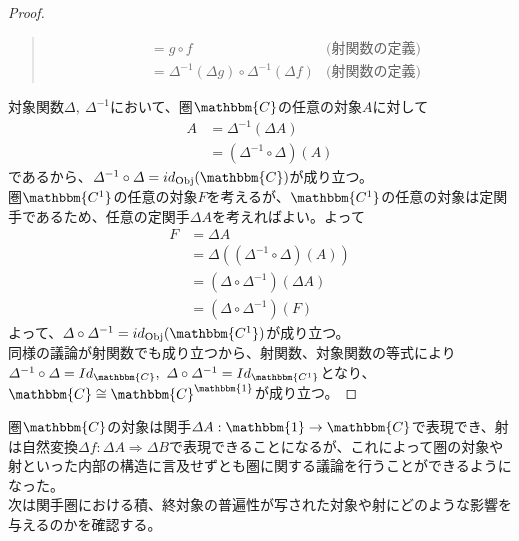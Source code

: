 \documentclass[uplatex,dvipdfmx]{jsarticle}
\newcommand{\cat}[1]{\mathbbm{#1}}
\newcommand{\arrow}{\rightarrow}
\newcommand{\functor}[3]{#1:\cat{#2}\arrow \cat{#3}}
\newcommand{\nat}[3]{#1:#2\Rightarrow #3}
\newcommand{\obj}[1]{\mathrm{Obj}(\cat{#1})}
\newcommand{\funccat}[2]{\cat{#2}^\cat{#1}}
\newtheorem{proof}{証明}[section]
\numberwithin{proof}{subsection}
\numberwithin{prop}{subsection}
\numberwithin{define}{subsection}
\begin{document}
\begin{proof}
\begin{quote}
\begin{description}
\begin{align*}
          &=g\circ f&\text{(射関数の定義)}\\
          &=\varDelta^{-1}(\varDelta g)\circ\varDelta^{-1}(\varDelta f)&\text{(射関数の定義)}
        \end{align*}
			\end{description}
		\end{quote}
    対象関数$\varDelta,\ \varDelta^{-1}$において、圏$\cat{C}$の任意の対象$A$に対して
    \begin{align*}
      A&=\varDelta^{-1}(\varDelta A)\\
      &=(\varDelta^{-1}\circ\varDelta)(A)
    \end{align*}
    であるから、$\varDelta^{-1}\circ\varDelta=id_\obj{C}$が成り立つ。\\
    圏$\cat{C^1}$の任意の対象$F$を考えるが、$\cat{C^1}$の任意の対象は定関手であるため、任意の定関手$\varDelta A$を考えればよい。よって
    \begin{align*}
      F&=\varDelta A\\
      &=\varDelta((\varDelta^{-1}\circ\varDelta)(A))\\
      &=(\varDelta\circ \varDelta^{-1})(\varDelta A)\\
      &=(\varDelta\circ \varDelta^{-1})(F)
    \end{align*}
    よって、$\varDelta\circ\varDelta^{-1}=id_\obj{C^1}$が成り立つ。\\
    同様の議論が射関数でも成り立つから、射関数、対象関数の等式により$\varDelta^{-1}\circ\varDelta=Id_\cat{C},\ \varDelta\circ\varDelta^{-1}=Id_\cat{C^1}$となり、$\cat{C}\cong\funccat{1}{C}$が成り立つ。
  \end{proof}
  圏$\cat{C}$の対象は関手$\functor{\varDelta A}{1}{C}$で表現でき、射は自然変換$\nat{\varDelta f}{\varDelta A}{\varDelta B}$で表現できることになるが、これによって圏の対象や射といった内部の構造に言及せずとも圏に関する議論を行うことができるようになった。\\
  次は関手圏における積、終対象の普遍性が写された対象や射にどのような影響を与えるのかを確認する。
\end{document}
